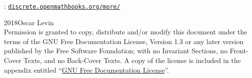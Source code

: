 \documentclass[oneside,10pt,]{book}
\newcommand{\mono}[1]{\texttt{#1}}
\numberwithin{equation}{chapter}
\begin{document}
\frontmatter

\thispagestyle{empty}
\hypertarget{g:colophon:idm22}{}
: \href{http:\slash{}\slash{}discrete.openmathbooks.org\slash{}more\slash{}}{\mono{discrete.openmathbooks.org/more/}}\par\medskip
\noindent\textcopyright{}2018\quad{}Oscar Levin\\[0.5\baselineskip]
Permission is granted to copy, distribute and\slash{}or modify this document under the terms of the GNU Free Documentation License, Version 1.3 or any later version published by the Free Software Foundation; with no Invariant Sections, no Front-Cover Texts, and no Back-Cover Texts.  A copy of the license is included in the appendix entitled ``\hyperref[x:appendix:appendix-gfdl]{GNU Free Documentation License}''.\par\medskip
{}
\null\clearpage
%
%
\typeout{************************************************}
\typeout{************************************************}
%
\end{document}
